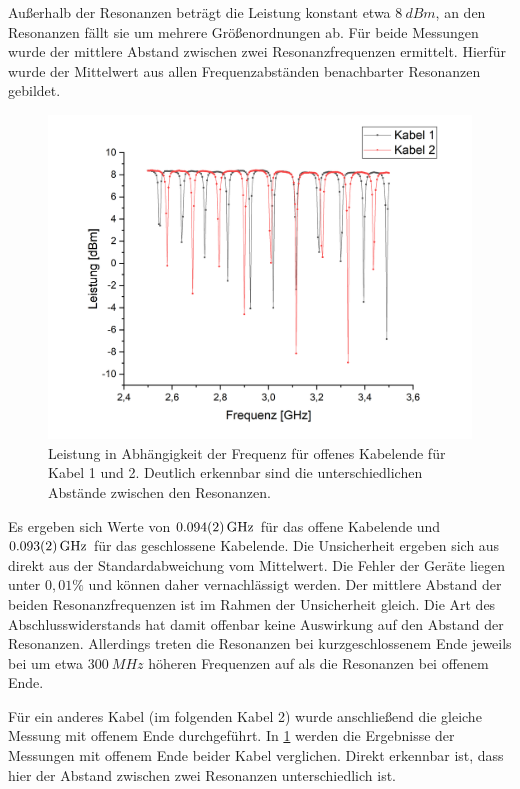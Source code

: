 Außerhalb der Resonanzen beträgt die Leistung konstant etwa $\SI{8}{dBm}$, an den Resonanzen fällt sie um mehrere Größenordnungen ab. Für beide Messungen wurde der mittlere Abstand zwischen zwei Resonanzfrequenzen ermittelt. Hierfür wurde der Mittelwert aus allen Frequenzabständen benachbarter Resonanzen gebildet.

\begin{figure}[h]
	\centering
	\includegraphics[scale=0.6]{anderes_Kabel.png}
	\caption{Leistung in Abhängigkeit der Frequenz für offenes Kabelende für Kabel 1 und 2. Deutlich erkennbar sind die unterschiedlichen Abstände zwischen den Resonanzen.}
	\label{anderes}
\end{figure}

Es ergeben sich Werte von $\SI{0,094\pm0,002}{GHz}$ für das offene Kabelende und $\SI{0,093\pm0,002}{GHz}$ für das geschlossene Kabelende. Die Unsicherheit ergeben sich aus direkt aus der Standardabweichung vom Mittelwert. Die Fehler der Geräte liegen unter $0,01\%$ und können daher vernachlässigt werden. Der mittlere Abstand der beiden Resonanzfrequenzen ist im Rahmen der Unsicherheit gleich. Die Art des Abschlusswiderstands hat damit offenbar keine Auswirkung auf den Abstand der Resonanzen. Allerdings treten die Resonanzen bei kurzgeschlossenem Ende jeweils bei um etwa $\SI{300}{MHz}$ höheren Frequenzen auf als die Resonanzen bei offenem Ende.

Für ein anderes Kabel (im folgenden Kabel 2) wurde anschließend die gleiche Messung mit offenem Ende durchgeführt. In \cref{anderes} werden die Ergebnisse der Messungen mit offenem Ende beider Kabel verglichen. Direkt erkennbar ist, dass hier der Abstand zwischen zwei Resonanzen unterschiedlich ist.


